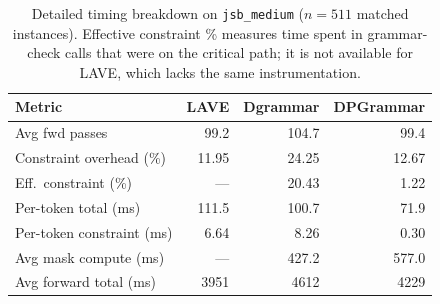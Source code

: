 \begin{table}[h]
\centering
\small
\begin{tabular}{lrrr}
\toprule
\textbf{Metric} & \textbf{LAVE} & \textbf{Dgrammar} & \textbf{DPGrammar} \\
\midrule
Avg fwd passes              & 99.2  & 104.7 & 99.4  \\
Constraint overhead (\%)    & 11.95 & 24.25 & 12.67 \\
Eff.\ constraint (\%)       & —     & 20.43 & 1.22  \\
Per-token total (ms)        & 111.5 & 100.7 & 71.9  \\
Per-token constraint (ms)   & 6.64  & 8.26  & 0.30  \\
Avg mask compute (ms)       & —     & 427.2 & 577.0 \\
Avg forward total (ms)      & 3951  & 4612  & 4229  \\
\bottomrule
\end{tabular}
\caption{Detailed timing breakdown on \texttt{jsb\_medium} ($n{=}511$ matched instances).
Effective constraint \% measures time spent in grammar-check calls that were on the critical path; it is not available for LAVE, which lacks the same instrumentation.}
\label{tab:timing}
\end{table}
